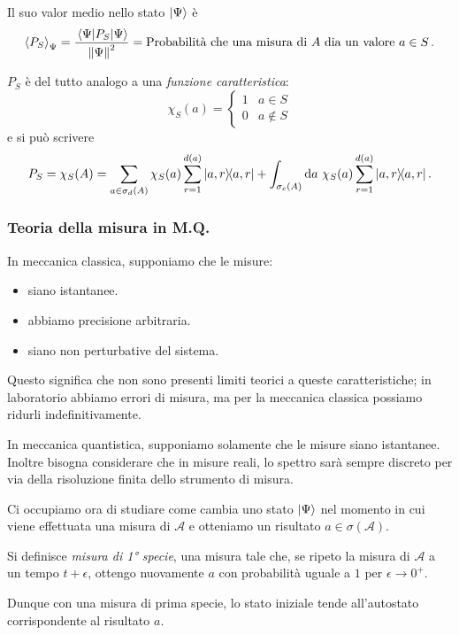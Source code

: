 Il suo valor medio nello stato \(\ket{\Psi}\) è
\[
    \expval{P_S}_\Psi = \frac{\expval{P_S}{\Psi}}{\norm{\Psi}^2}
    = \text{Probabilità che una misura di } A \text{ dia un valore } a \in S\,.
\]

\begin{remark}
    \(P_S\) è del tutto analogo a una \textit{funzione caratteristica}:
    \[
        \chi_S(a) =
        \begin{cases}
            1 & a \in S \\
            0 & a \notin S
        \end{cases}
    \]
    e si può scrivere
    \begin{equation}
        P_S = \chi_S(A)
        = \sum_{a \in \sigma_d(A)} \chi_S(a) \sum_{r=1}^{d(a)} \dyad{a,r}{a,r}
        + \int_{\sigma_c(A)} \dd{a}\, \chi_S(a) \sum_{r=1}^{d(a)} \dyad{a,r}{a,r}.
    \end{equation}
\end{remark}

    
\subsubsection{Teoria della misura in M.Q.}
In meccanica classica, supponiamo che le misure:
\begin{itemize}
    \item siano istantanee.
    \item abbiamo precisione arbitraria.
    \item siano non perturbative del sistema.
\end{itemize}

Questo significa che non sono presenti limiti teorici a queste caratteristiche; in laboratorio abbiamo errori di misura, ma per la meccanica classica possiamo ridurli indefinitivamente.

In meccanica quantistica, supponiamo solamente che le misure siano istantanee. Inoltre bisogna considerare che in misure reali, lo spettro sarà sempre discreto per via della risoluzione finita dello strumento di misura.

Ci occupiamo ora di studiare come cambia uno stato \(\ket{\Psi}\) nel momento in cui viene effettuata una misura di \(\mathcal{A}\) e otteniamo un risultato \(a \in \sigma(\mathcal{A})\).

\begin{definition}
    Si definisce \textit{misura di 1° specie}, una misura tale che, se ripeto la misura di \(\mathcal{A}\) a un tempo
    \(t+ \epsilon\), ottengo nuovamente \(a\) con probabilità uguale a \(1\) per \(\epsilon\to 0^+\).
\end{definition}
Dunque con una misura di prima specie, lo stato iniziale tende all'autostato corrispondente al risultato \(a\).

